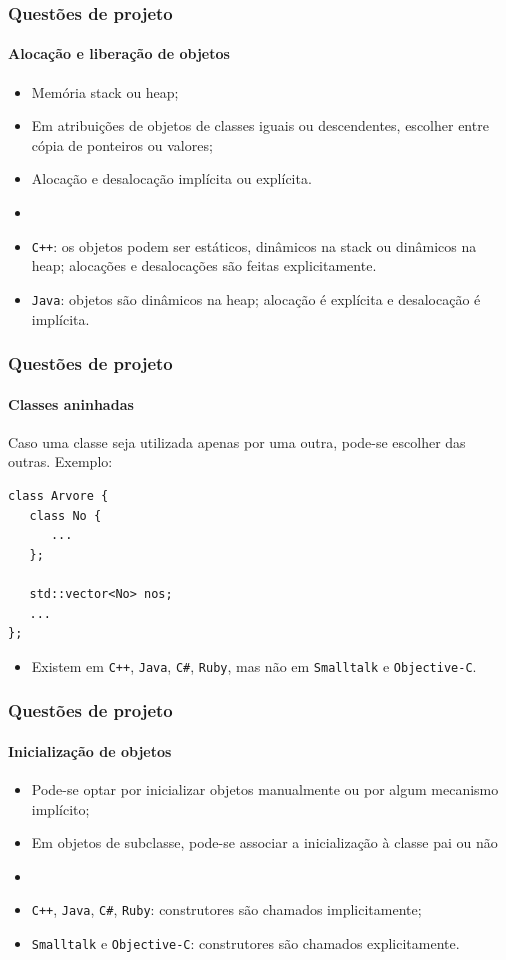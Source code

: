 \begin{frame}
\frametitle{Questões de projeto}
\framesubtitle{Alocação e liberação de objetos}
\begin{itemize}
\item Memória stack ou heap;
\item Em atribuições de objetos de classes iguais ou descendentes, escolher entre cópia de ponteiros ou valores;
\item Alocação e desalocação implícita ou explícita.
\item {}
\item \texttt{C++}: os objetos podem ser estáticos, dinâmicos na stack ou dinâmicos na heap;  alocações e desalocações são feitas explicitamente.
\item \texttt{Java}: objetos são dinâmicos na heap; alocação é explícita e desalocação é implícita.
\end{itemize}
\end{frame}


\begin{frame}[fragile]
\frametitle{Questões de projeto}
\framesubtitle{Classes aninhadas}
Caso uma classe seja utilizada apenas por uma outra, pode-se escolher  das outras. Exemplo:

\begin{verbatim}
class Arvore {
   class No {
      ...
   };

   std::vector<No> nos;
   ...
};
\end{verbatim}

\begin{itemize}
\item Existem em \texttt{C++}, \texttt{Java}, \texttt{C\#}, \texttt{Ruby}, mas não em \texttt{Smalltalk} e \texttt{Objective-C}.
\end{itemize}

\end{frame}


\begin{frame}
\frametitle{Questões de projeto}
\framesubtitle{Inicialização de objetos}

\begin{itemize}
\item Pode-se optar por inicializar objetos manualmente ou por algum mecanismo implícito;
\item Em objetos de subclasse, pode-se associar a inicialização à classe pai ou não
\item {}
\item \texttt{C++}, \texttt{Java}, \texttt{C\#}, \texttt{Ruby}: construtores são chamados implicitamente;
\item \texttt{Smalltalk} e \texttt{Objective-C}: construtores são chamados explicitamente.
\end{itemize}
	
\end{frame}

